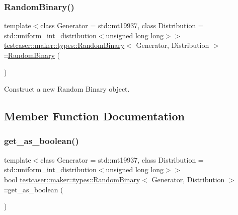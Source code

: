 \subsubsection{\texorpdfstring{RandomBinary()}{RandomBinary()}}
{\footnotesize\ttfamily template$<$class Generator = std\+::mt19937, class Distribution = std\+::uniform\+\_\+int\+\_\+distribution$<$unsigned long long$>$$>$ \\
\mbox{\hyperlink{structtestcaser_1_1maker_1_1types_1_1RandomBinary}{testcaser\+::maker\+::types\+::\+Random\+Binary}}$<$ Generator, Distribution $>$\+::\mbox{\hyperlink{structtestcaser_1_1maker_1_1types_1_1RandomBinary}{Random\+Binary}} (\begin{DoxyParamCaption}{ }\end{DoxyParamCaption})\hspace{0.3cm}{\ttfamily [inline]}}



Construct a new Random Binary object. 



\subsection{Member Function Documentation}
\mbox{\label{structtestcaser_1_1maker_1_1types_1_1RandomBinary_a469154b51a27681c713c8b93ec1626b5}} 
\subsubsection{\texorpdfstring{get\_as\_boolean()}{get\_as\_boolean()}}
{\footnotesize\ttfamily template$<$class Generator = std\+::mt19937, class Distribution = std\+::uniform\+\_\+int\+\_\+distribution$<$unsigned long long$>$$>$ \\
bool \mbox{\hyperlink{structtestcaser_1_1maker_1_1types_1_1RandomBinary}{testcaser\+::maker\+::types\+::\+Random\+Binary}}$<$ Generator, Distribution $>$\+::get\+\_\+as\+\_\+boolean (\begin{DoxyParamCaption}{ }\end{DoxyParamCaption})\hspace{0.3cm}{\ttfamily [inline]}}



